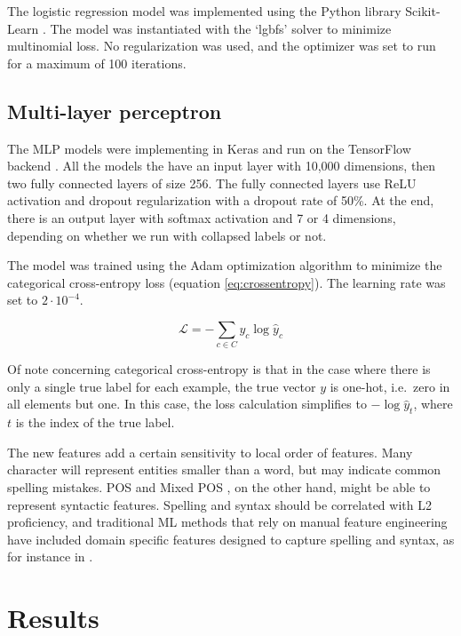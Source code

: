 The logistic regression model was implemented using the Python library
Scikit-Learn \autocite{scikit-learn}. The model was instantiated with the
`lgbfs' solver to minimize multinomial loss. No regularization was used, and
the optimizer was set to run for a maximum of 100 iterations.


\subsection{Multi-layer perceptron}
\label{subsec:mlp}

The MLP models were implementing in Keras \autocite{keras} and run on the
TensorFlow backend \autocite{tensorflow}. All the models the have an input
layer with 10,000 dimensions, then two fully connected layers of size 256.
The fully connected layers use \ac{ReLU} activation and dropout
regularization with a dropout rate of 50\%. At the end, there is an output
layer with softmax activation and 7 or 4 dimensions, depending on whether we
run with collapsed labels or not.

The model was trained using the Adam optimization algorithm
\autocite{kingma2014adam} to minimize the categorical cross-entropy loss
(equation \ref{eq:crossentropy}). The learning rate was set to $2\cdot
10^{-4}$.

\begin{equation}\label{eq:crossentropy}
  \mathcal{L} = -\sum_{c\in C} {y_c \log{{\hat y}_c}}
\end{equation}

Of note concerning categorical cross-entropy is that in the case where there
is only a single true label for each example, the true vector $y$ is one-hot,
i.e.\ zero in all elements but one. In this case, the loss calculation
simplifies to $-\log{{\hat y}_t}$, where $t$ is the index of the true label.

The new \ngram features add a certain sensitivity to local order of features.
Many character \ngrams will represent entities smaller than a word, but may
indicate common spelling mistakes. \ac{POS} and Mixed POS \ngrams, on the
other hand, might be able to represent syntactic features. Spelling and
syntax should be correlated with L2 proficiency, and traditional \ac{ML}
methods that rely on manual feature engineering have included domain specific
features designed to capture spelling and syntax, as for instance in
\textcite{vajjala17}.


\section{Results}

